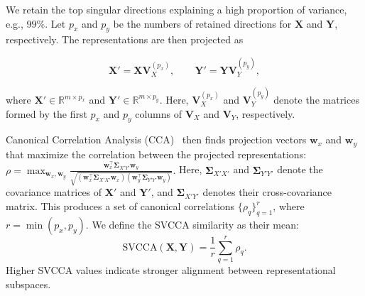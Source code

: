 We retain the top singular directions explaining a high proportion of variance, e.g., $99\%$. Let $p_x$ and $p_y$ be the numbers of retained directions for $\mathbf{X}$ and $\mathbf{Y}$, respectively. The representations are then projected as

\begin{equation}
\mathbf{X}' = \mathbf{X}\mathbf{V}_X^{(p_x)}, 
\qquad
\mathbf{Y}' = \mathbf{Y}\mathbf{V}_Y^{(p_y)} ,
\end{equation}

where $\mathbf{X}'\in\mathbb{R}^{m\times p_x}$ and
$\mathbf{Y}'\in\mathbb{R}^{m\times p_y}$. Here, $\mathbf{V}_X^{(p_x)}$ and $\mathbf{V}_Y^{(p_y)}$
denote the matrices formed by the first $p_x$ and $p_y$ columns of
$\mathbf{V}_X$ and $\mathbf{V}_Y$, respectively.

Canonical Correlation Analysis (CCA)~\cite{thompson2000canonical} then finds projection vectors $\mathbf{w}_x$ and $\mathbf{w}_y$ that maximize the correlation between the projected representations:
$
\rho =
\max_{\mathbf{w}_x, \mathbf{w}_y}
\frac{
\mathbf{w}_x^\top \boldsymbol{\Sigma}_{X'Y'} \mathbf{w}_y
}{
\sqrt{
(\mathbf{w}_x^\top \boldsymbol{\Sigma}_{X'X'} \mathbf{w}_x)
(\mathbf{w}_y^\top \boldsymbol{\Sigma}_{Y'Y'} \mathbf{w}_y)
}
}.
$
Here, $\boldsymbol{\Sigma}_{X'X'}$ and $\boldsymbol{\Sigma}_{Y'Y'}$ denote the covariance matrices of
$\mathbf{X}'$ and $\mathbf{Y}'$, and $\boldsymbol{\Sigma}_{X'Y'}$ denotes their cross-covariance matrix. This produces a set of canonical correlations
$\{\rho_q\}_{q=1}^{r}$, where $r=\min(p_x,p_y)$.
We define the SVCCA similarity as their mean:
\begin{equation}
\mathrm{SVCCA}(\mathbf{X},\mathbf{Y})
=
\frac{1}{r}\sum_{q=1}^{r}\rho_q .
\end{equation}
Higher SVCCA values indicate stronger alignment between representational subspaces.
